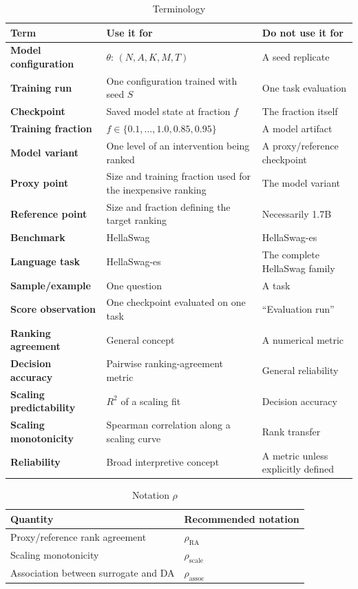 \begin{table}[h]
    \caption{Terminology}
    \label{tab:terminology}
    \centering
    \begin{tabular}{lll}
        \toprule
        Term & Use it for & Do not use it for \\
        \midrule
        \textbf{Model configuration} & $\theta$: \((N,A,K,M,T)\) & A seed replicate \\
        \textbf{Training run} & One configuration trained with seed \(S\) & One task evaluation \\
        \textbf{Checkpoint} & Saved model state at fraction \(f\) & The fraction itself \\
        \textbf{Training fraction} & \(f\in\{0.1,\ldots,1.0,0.85,0.95\}\) & A model artifact \\
        \textbf{Model variant} & One level of an intervention being ranked & A proxy/reference checkpoint \\
        \textbf{Proxy point} & Size and training fraction used for the inexpensive ranking & The model variant \\
        \textbf{Reference point} & Size and fraction defining the target ranking & Necessarily 1.7B \\
        \textbf{Benchmark} & HellaSwag & HellaSwag-es \\
        \textbf{Language task} & HellaSwag-es & The complete HellaSwag family \\
        \textbf{Sample/example} & One question & A task \\
        \textbf{Score observation} & One checkpoint evaluated on one task & ``Evaluation run'' \\
        \textbf{Ranking agreement} & General concept & A numerical metric \\
        \textbf{Decision accuracy} & Pairwise ranking-agreement metric & General reliability \\
        \textbf{Scaling predictability} & \(R^2\) of a scaling fit & Decision accuracy \\
        \textbf{Scaling monotonicity} & Spearman correlation along a scaling curve & Rank transfer \\
        \textbf{Reliability} & Broad interpretive concept & A metric unless explicitly defined \\
        \bottomrule
    \end{tabular}
\end{table}

\begin{table}[h]
    \caption{Notation $\rho$}
    \label{tab:notation-rho}
    \centering
    \begin{tabular}{|l|l|}
        \hline
        Quantity & Recommended notation \\ \hline
        Proxy/reference rank agreement & \(\rho_{\mathrm{RA}}\) \\ \hline
        Scaling monotonicity & \(\rho_{\mathrm{scale}}\) \\ \hline
        Association between surrogate and DA & \(\rho_{\mathrm{assoc}}\) \\ \hline
    \end{tabular}
\end{table}
